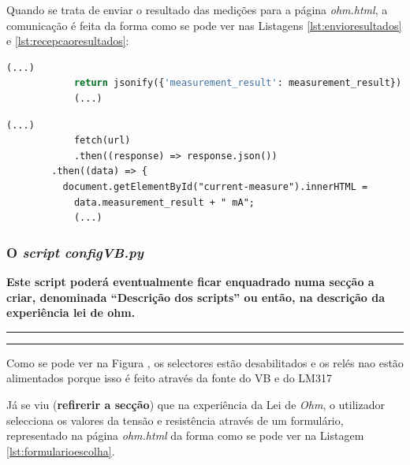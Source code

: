 Quando se trata de enviar o resultado das medições para a página \textit{ohm.html}, a comunicação é feita da forma como se pode ver nas Listagens \ref{lst:envioresultados} e \ref{lst:recepcaoresultados}:
\begin{center}
	\begin{minipage}{0.7\linewidth}
		\begin{lstlisting}[language=python, caption=Envio de resultados do servidor (\textit{views.py}) para a página \textit{ohm.html}, label=lst:envioresultados]
			(...)
			return jsonify({'measurement_result': measurement_result})
			(...)
	\end{lstlisting}
	\end{minipage}
\end{center}

\begin{center}
	\begin{minipage}{0.7\linewidth}
		\begin{lstlisting}[language=html, caption=Recepção de resultados na página \textit{ohm.html}, label=lst:recepcaoresultados]
			(...)
			fetch(url)
			.then((response) => response.json())
		.then((data) => {
		  document.getElementById("current-measure").innerHTML =
			data.measurement_result + " mA";
			(...)
			\end{lstlisting}
	\end{minipage}
\end{center}

\subsubsection{O \textit{script configVB.py}}
\textbf{Este script poderá eventualmente ficar enquadrado numa secção a criar, denominada ``Descrição dos scripts'' ou então, na descrição da experiência lei de ohm.}

\hrule
\hrule

Como se pode ver na Figura , os selectores estão desabilitados e os relés nao estão alimentados porque isso é feito através da fonte do VB e do LM317

Já se viu (\textbf{refirerir a secção}) que na experiência da Lei de \textit{Ohm}, o utilizador selecciona os valores da tensão e resistência através de um formulário, representado na página \textit{ohm.html} da forma como se pode ver na Listagem \ref{lst:formularioescolha}.

